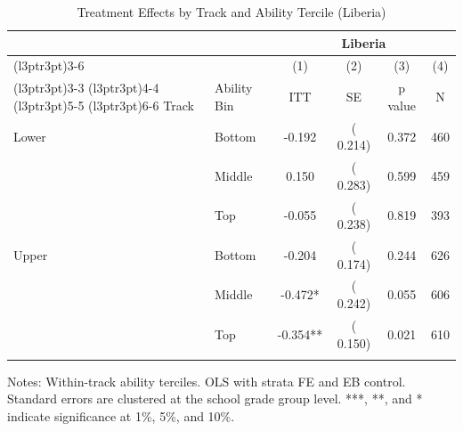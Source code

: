 \begin{table}[H]
\centering
\caption{Treatment Effects by Track and Ability Tercile (Liberia)}
\label{tab:track_bins}
\begin{threeparttable}
\begin{tabular}[t]{llcccc}
\toprule
\multicolumn{2}{c}{ } & \multicolumn{4}{c}{Liberia} \\
\cmidrule(l{3pt}r{3pt}){3-6}
 &  & \multicolumn{1}{c}{(1)} & \multicolumn{1}{c}{(2)} & \multicolumn{1}{c}{(3)} & \multicolumn{1}{c}{(4)} \\
\cmidrule(l{3pt}r{3pt}){3-3} \cmidrule(l{3pt}r{3pt}){4-4} \cmidrule(l{3pt}r{3pt}){5-5} \cmidrule(l{3pt}r{3pt}){6-6}
Track & Ability Bin & ITT & SE & p value & N \\
\midrule
Lower & Bottom &  -0.192 & (  0.214) & 0.372 & 460 \\
 & Middle &   0.150 & (  0.283) & 0.599 & 459 \\
 & Top &  -0.055 & (  0.238) & 0.819 & 393 \\
\addlinespace
Upper & Bottom &  -0.204 & (  0.174) & 0.244 & 626 \\
 & Middle &  -0.472* & (  0.242) & 0.055 & 606 \\
 & Top &  -0.354** & (  0.150) & 0.021 & 610 \\
\addlinespace
\bottomrule
\end{tabular}
\begin{tablenotes}[para]
\item Notes: Within-track ability terciles. OLS with strata FE and EB control. Standard errors are clustered at the school grade group level. ***, **, and * indicate significance at 1\%, 5\%, and 10\%.
\end{tablenotes}
\end{threeparttable}
\end{table}
